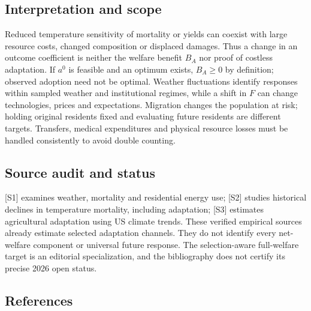 \documentclass[11pt,a4paper]{article}
\begin{document}
\subsection*{Interpretation and scope}

Reduced temperature sensitivity of mortality or yields can coexist with large resource costs, changed composition or displaced damages. Thus a change in an outcome coefficient is neither the welfare benefit $B_A$ nor proof of costless adaptation. If $a^0$ is feasible and an optimum exists, $B_A\ge0$ by definition; observed adoption need not be optimal. Weather fluctuations identify responses within sampled weather and institutional regimes, while a shift in $F$ can change technologies, prices and expectations. Migration changes the population at risk; holding original residents fixed and evaluating future residents are different targets. Transfers, medical expenditures and physical resource losses must be handled consistently to avoid double counting.

\subsection*{Source audit and status}

[S1] examines weather, mortality and residential energy use; [S2] studies historical declines in temperature mortality, including adaptation; [S3] estimates agricultural adaptation using US climate trends. These verified empirical sources already estimate selected adaptation channels. They do not identify every net-welfare component or universal future response. The selection-aware full-welfare target is an editorial specialization, and the bibliography does not certify its precise 2026 open status.

\subsection*{References}
\end{document}
